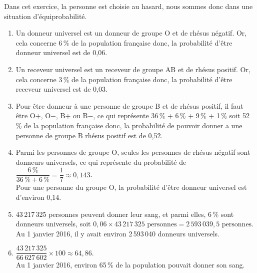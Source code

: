    Dans cet exercice, la personne est choisie au hasard, nous sommes donc dans une situation d'équiprobabilité.
   \begin{enumerate}
      \item Un donneur universel est un donneur de groupe O et de rhésus négatif. Or, cela concerne 6\,\% de la population française donc, {\blue la probabilité d'être donneur universel est de 0,06.}
      \item Un receveur universel est un receveur de groupe AB et de rhésus positif. Or, cela concerne 3\,\% de la population française donc, {\blue la probabilité d'être receveur universel est de 0,03.}
      \item Pour être donneur à une personne de groupe B et de rhésus positif, il faut être O$+$, O$-$, B$+$ ou B$-$, ce qui représente 36\,\% + 6\,\% + 9\,\% + 1\,\% soit 52\,\% de la population française donc, {\blue la probabilité de pouvoir donner a une personne de groupe B rhésus positif est de 0,52.}
      \item Parmi les personnes de groupe O, seules les personnes de rhésus négatif sont donneurs universels, ce qui représente du probabilité de $\dfrac{6\,\%}{36\,\%+6\,\%} =\dfrac17 \approx 0,143$. \\ [2mm]
         {\blue Pour une personne du groupe O, la probabilité d'être donneur universel est d'environ 0,14.}
      \item 43\,217\,325 personnes peuvent donner leur sang, et parmi elles, 6\,\% sont donneurs universels, soit $0,06\times43\,217\,325\text{ personnes} =2\,593\,039,5\text{ personnes}$. \\
         {\blue Au 1 janvier 2016, il y avait environ 2\,593\,040 donneurs universels.} \\ [2mm]
      \item $\dfrac{43\,217\,325}{66\,627\,602}\times100 \approx64,86.$ \\ [2mm]
         {\blue Au 1 janvier 2016, environ 65\,\% de la population pouvait donner son sang.}
   \end{enumerate}
